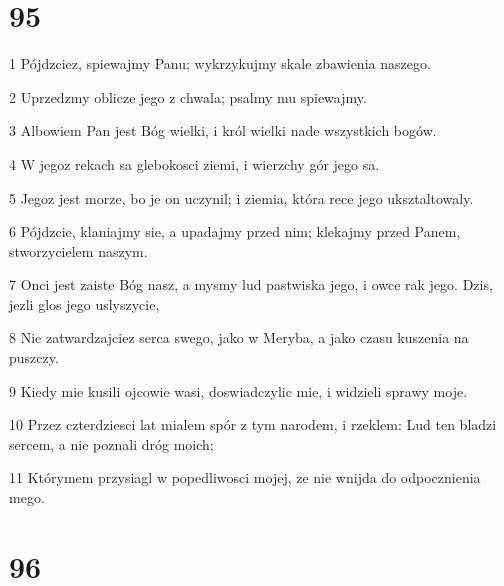 \chapter{95}

\par 1 Pójdzciez, spiewajmy Panu; wykrzykujmy skale zbawienia naszego.
\par 2 Uprzedzmy oblicze jego z chwala; psalmy mu spiewajmy.
\par 3 Albowiem Pan jest Bóg wielki, i król wielki nade wszystkich bogów.
\par 4 W jegoz rekach sa glebokosci ziemi, i wierzchy gór jego sa.
\par 5 Jegoz jest morze, bo je on uczynil; i ziemia, która rece jego uksztaltowaly.
\par 6 Pójdzcie, klaniajmy sie, a upadajmy przed nim; klekajmy przed Panem, stworzycielem naszym.
\par 7 Onci jest zaiste Bóg nasz, a mysmy lud pastwiska jego, i owce rak jego. Dzis, jezli glos jego uslyszycie,
\par 8 Nie zatwardzajciez serca swego, jako w Meryba, a jako czasu kuszenia na puszczy.
\par 9 Kiedy mie kusili ojcowie wasi, doswiadczylic mie, i widzieli sprawy moje.
\par 10 Przez czterdziesci lat mialem spór z tym narodem, i rzeklem: Lud ten bladzi sercem, a nie poznali dróg moich;
\par 11 Którymem przysiagl w popedliwosci mojej, ze nie wnijda do odpocznienia mego.

\chapter{96}

